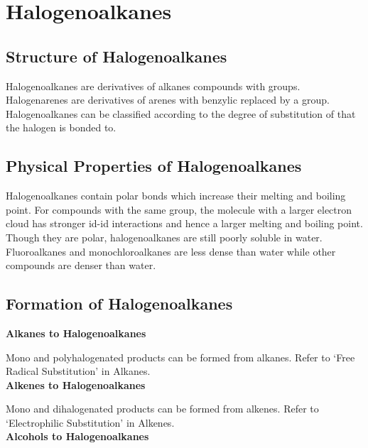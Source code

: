 \documentclass[../main]{subfiles}
\begin{document}
\section{Halogenoalkanes}

	\subsection{Structure of Halogenoalkanes}

	Halogenoalkanes are derivatives of alkanes compounds with  groups. Halogenarenes are derivatives of arenes with benzylic  replaced by a  group. \\

	Halogenoalkanes can be classified according to the degree of substitution of  that the halogen is bonded to.

	\subsection{Physical Properties of Halogenoalkanes}

	Halogenoalkanes contain polar  bonds which increase their melting and boiling point. For compounds with the same  group, the molecule with a larger  electron cloud has stronger id-id interactions and hence a larger melting and boiling point. \\

	Though they are polar, halogenoalkanes are still poorly soluble in water. Fluoroalkanes and monochloroalkanes are less dense than water while other  compounds are denser than water.

	\subsection{Formation of Halogenoalkanes}

	\noindent \textbf{Alkanes to Halogenoalkanes}

	Mono and polyhalogenated products can be formed from alkanes. Refer to `Free Radical Substitution' in Alkanes. \\

	\noindent \textbf{Alkenes to Halogenoalkanes}

	Mono and dihalogenated products can be formed from alkenes. Refer to `Electrophilic Substitution' in Alkenes. \\

	\noindent \textbf{Alcohols to Halogenoalkanes}
\end{document}
